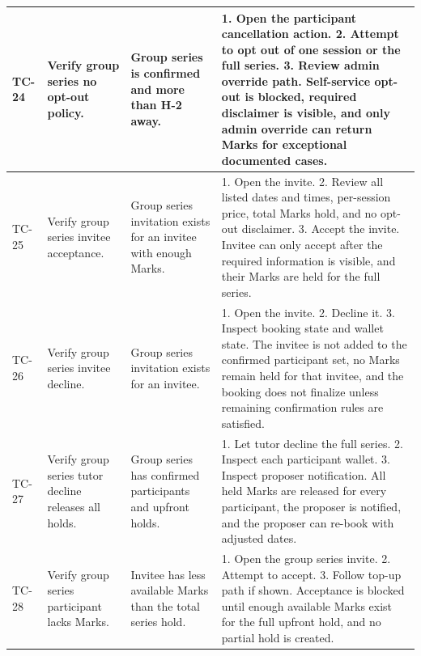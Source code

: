 \documentclass[11pt,a4paper]{article}
\begin{document}
\begin{longtable}{|L{1.2cm}|L{3.3cm}|L{3.9cm}|L{6.0cm}|}
	\hline
	TC-24          & Verify group series no opt-out policy.              & Group series is confirmed and more than H-2 away.                                & 1. Open the participant cancellation action. 2. Attempt to opt out of one session or the full series. 3. Review admin override path. \newline Self-service opt-out is blocked, required disclaimer is visible, and only admin override can return Marks for exceptional documented cases.                                                      \\
	\hline
	TC-25          & Verify group series invitee acceptance.              & Group series invitation exists for an invitee with enough Marks.                                & 1. Open the invite. 2. Review all listed dates and times, per-session price, total Marks hold, and no opt-out disclaimer. 3. Accept the invite. \newline Invitee can only accept after the required information is visible, and their Marks are held for the full series.                                                      \\
	\hline
	TC-26          & Verify group series invitee decline.              & Group series invitation exists for an invitee.                                & 1. Open the invite. 2. Decline it. 3. Inspect booking state and wallet state. \newline The invitee is not added to the confirmed participant set, no Marks remain held for that invitee, and the booking does not finalize unless remaining confirmation rules are satisfied.                                                      \\
	\hline
	TC-27          & Verify group series tutor decline releases all holds.              & Group series has confirmed participants and upfront holds.                                & 1. Let tutor decline the full series. 2. Inspect each participant wallet. 3. Inspect proposer notification. \newline All held Marks are released for every participant, the proposer is notified, and the proposer can re-book with adjusted dates.                                                      \\
	\hline
	TC-28          & Verify group series participant lacks Marks.              & Invitee has less available Marks than the total series hold.                                & 1. Open the group series invite. 2. Attempt to accept. 3. Follow top-up path if shown. \newline Acceptance is blocked until enough available Marks exist for the full upfront hold, and no partial hold is created.                                                      \\

\end{longtable}
\end{document}

